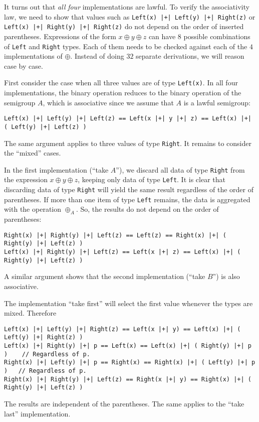 It turns out that \emph{all} \emph{four} implementations are lawful.
To verify the associativity law, we need to show that values such
as \lstinline!Left(x) |+| Left(y) |+| Right(z)! or \lstinline!Left(x) |+| Right(y) |+| Right(z)!
do not depend on the order of inserted parentheses. Expressions of
the form $x\oplus y\oplus z$ can have $8$ possible combinations
of \lstinline!Left! and \lstinline!Right! types. Each of them needs
to be checked against each of the $4$ implementations of $\oplus$.
Instead of doing $32$ separate derivations, we will reason case by
case.

First consider the case when all three values are of type \lstinline!Left(x)!.
In all four implementations, the binary operation reduces to the binary
operation of the semigroup $A$, which is associative since we assume
that $A$ is a lawful semigroup:
\begin{lstlisting}
Left(x) |+| Left(y) |+| Left(z) == Left(x |+| y |+| z) == Left(x) |+| ( Left(y) |+| Left(z) )
\end{lstlisting}

The same argument applies to three values of type \lstinline!Right!.
It remains to consider the ``mixed'' cases.

In the first implementation (``take $A$''), we discard all data
of type \lstinline!Right! from the expression $x\oplus y\oplus z$,
keeping only data of type \lstinline!Left!. It is clear that discarding
data of type \lstinline!Right! will yield the same result regardless
of the order of parentheses. If more than one item of type \lstinline!Left!
remains, the data is aggregated with the operation $\oplus_{A}$.
So, the results do not depend on the order of parentheses:
\begin{lstlisting}
Right(x) |+| Right(y) |+| Left(z) == Left(z) == Right(x) |+| ( Right(y) |+| Left(z) )
Left(x) |+| Right(y) |+| Left(z) == Left(x |+| z) == Left(x) |+| ( Right(y) |+| Left(z) )
\end{lstlisting}

A similar argument shows that the second implementation (``take $B$'')
is also associative.

The implementation ``take first'' will select the first value whenever
the types are mixed. Therefore
\begin{lstlisting}[mathescape=true]
Left(x) |+| Left(y) |+| Right(z) == Left(x |+| y) == Left(x) |+| ( Left(y) |+| Right(z) )
Left(x) |+| Right(y) |+| p == Left(x) == Left(x) |+| ( Right(y) |+| p )    // Regardless of p.
Right(x) |+| Left(y) |+| p == Right(x) == Right(x) |+| ( Left(y) |+| p )   // Regardless of p.
Right(x) |+| Right(y) |+| Left(z) == Right(x |+| y) == Right(x) |+| ( Right(y) |+| Left(z) )
\end{lstlisting}
The results are independent of the parentheses. The same applies to
the ``take last'' implementation.

